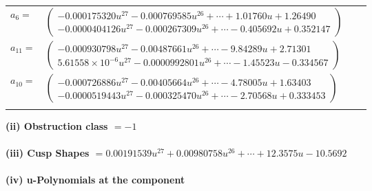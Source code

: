 \documentclass[1p]{elsarticle_modified}
\theoremstyle{definition}
\begin{document}
\begin{tabular}{m{7pt} m{180pt} m{7pt} m{180pt} }
\flushright $a_{6}=$&$\begin{pmatrix}-0.000175320 u^{27}-0.000769585 u^{26}+\cdots+1.01760 u+1.26490\\-0.0000404126 u^{27}-0.000267309 u^{26}+\cdots-0.405692 u+0.352147\end{pmatrix}$ \\
\flushright $a_{11}=$&$\begin{pmatrix}-0.000930798 u^{27}-0.00487661 u^{26}+\cdots-9.84289 u+2.71301\\5.61558\times10^{-6} u^{27}-0.0000992801 u^{26}+\cdots-1.45523 u-0.334567\end{pmatrix}$ \\
\flushright $a_{10}=$&$\begin{pmatrix}-0.000726886 u^{27}-0.00405664 u^{26}+\cdots-4.78005 u+1.63403\\-0.0000519443 u^{27}-0.000325470 u^{26}+\cdots-2.70568 u+0.333453\end{pmatrix}$\\&\end{tabular}
\flushleft \textbf{(ii) Obstruction class $= -1$}\\~\\
\flushleft \textbf{(iii) Cusp Shapes $= 0.00191539 u^{27}+0.00980758 u^{26}+\cdots+12.3575 u-10.5692$}\\~\\
\newpage\renewcommand{\arraystretch}{1}
\flushleft \textbf{(iv) u-Polynomials at the component}\newline \\
\end{document}
